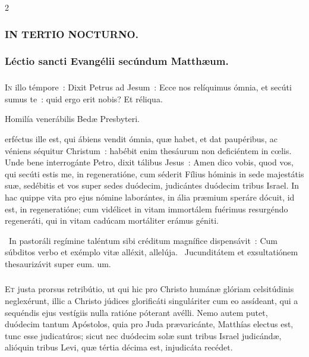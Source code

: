 \documentclass[9pt,twoside]{extarticle}
\begin{document}
\begin{multicols}{2}
{\subsubsection*{\center \textsc{IN TERTIO NOCTURNO.}}
\subsubsection*{\center Léctio sancti Evangélii secúndum Matthæum.}
\subsubsection*{\center {}}
\lettrine{I}n illo témpore~: Dixit Petrus ad Jesum~: Ecce nos relíquimus ómnia, et secúti sumus te~: quid ergo erit nobis? Et réliqua.

\begin{center}Homilía venerábilis Bedæ Presbyteri.\\
\end{center}
erféctus ille est, qui ábiens vendit ómnia, quæ habet, et dat paupéribus, ac véniens séquitur Christum~: habébit enim thesáurum non deficiéntem in cœlis. Unde bene interrogánte Petro, dixit tálibus Jesus~: Amen dico vobis, quod vos, qui secúti estis me, in regeneratióne, cum séderit Fílius hóminis in sede majestátis suæ, sedébitis et vos super sedes duódecim, judicántes duódecim tribus Israel. In hac quippe vita pro ejus nómine laborántes, in ália præmium speráre dócuit, id est, in regeneratióne; cum vidélicet in vitam immortálem fuérimus resurgéndo regeneráti, qui in vitam cadúcam mortáliter erámus géniti.

\begin{tightlist}{}
\item {}~In pastoráli regímine taléntum sibi créditum magnífice dispensávit~: \textred{*} Cum súbditos verbo et exémplo vitæ alléxit, allelúja. ~Jucunditátem et exsultatiónem thesaurizávit super eum. um.
\end{tightlist}

\subsubsection*{\center {}}
\lettrine{E}t justa prorsus retribútio, ut qui hic pro Christo humánæ glóriam celsitúdinis neglexérunt, illic a Christo júdices glorificáti singuláriter cum eo assídeant, qui a sequéndis ejus vestígiis nulla ratióne póterant avélli. Nemo autem putet, duódecim tantum Apóstolos, quia pro Juda prævaricánte, Matthías electus est, tunc esse judicatúros; sicut nec duódecim solæ sunt tribus Israel judicándæ, alióquin tribus Levi, quæ tértia décima est, injudicáta recédet.

}
\end{multicols}
\end{document}
